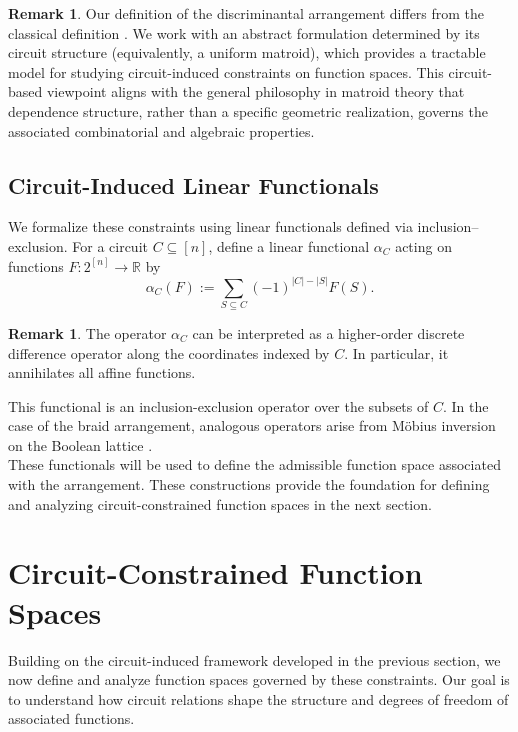 \documentclass{amsart}
\theoremstyle{definition}
\newtheorem{remark}[theorem]{Remark}
\begin{document}
\begin{remark}
Our definition of the discriminantal arrangement differs from the classical definition \cite{Manin}. We work with an abstract formulation determined by its circuit structure (equivalently, a uniform matroid), which provides a tractable model for studying circuit-induced constraints on function spaces. This circuit-based viewpoint aligns with the general philosophy in matroid theory that dependence structure, rather than a specific geometric realization, governs the associated combinatorial and algebraic properties.
\end{remark}
\subsection{Circuit-Induced Linear Functionals}
We formalize these constraints using linear functionals defined via inclusion–exclusion.
For a circuit $C \subseteq [n]$, define a linear functional $\alpha_C$ acting on functions $F : 2^{[n]} \to \mathbb{R}$ by
\[
\alpha_C(F) := \sum_{S \subseteq C} (-1)^{|C| - |S|} F(S).
\]
\begin{remark}
The operator $\alpha_C$ can be interpreted as a higher-order discrete difference operator along the coordinates indexed by $C$. In particular, it annihilates all affine functions.
\end{remark}
\noindent
This functional is an inclusion-exclusion operator over the subsets of $C$. In the case of the braid arrangement, analogous operators arise from Möbius inversion on the Boolean lattice \cite{stanley2007}.\\
\noindent
These functionals will be used to define the admissible function space associated with the arrangement. These constructions provide the foundation for defining and analyzing circuit-constrained function spaces in the next section.


\section{Circuit-Constrained Function Spaces}\label{sec:circuit}
Building on the circuit-induced framework developed in the previous section, we now define and analyze function spaces governed by these constraints. Our goal is to understand how circuit relations shape the structure and degrees of freedom of associated functions.
\end{document}
